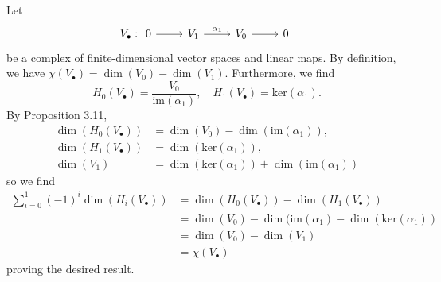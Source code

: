 \documentclass[../../master.tex]{subfiles}
\begin{document}
\begin{solution}
    Let
	\[
        V_{\bullet}:
	\begin{tikzcd}
            0 & V_1 & V_0 & 0
	    \arrow[from=1-1, to=1-2]
	    \arrow[from=1-2, to=1-3, "\alpha_1"]
	    \arrow[from=1-3, to=1-4]
	\end{tikzcd}
	\]
        be a complex of finite-dimensional vector spaces and linear maps.
        By definition, we have $\chi(V_{\bullet}) = \dim(V_0) - \dim(V_1)$.
        Furthermore, we find
        \[
            H_0 (V_{\bullet}) = \frac{V_0}{\text{im} (\alpha_1)}, \quad H_1(V_{\bullet}) = \text{ker} (\alpha_1).
        \]
        By Proposition 3.11,
        \begin{align*}
            \dim(H_0(V_{\bullet})) &= \dim(V_0) - \dim(\text{im} (\alpha_1)), \\
            \dim(H_1(V_{\bullet})) &= \dim(\text{ker} (\alpha_1)), \\
            \dim(V_1) &= \dim(\text{ker} (\alpha_1)) + \dim(\text{im} (\alpha_1))
        \end{align*}
        so we find
        \begin{align*}
            \sum_{i=0}^{1} (-1)^{i} \dim(H_i(V_{\bullet})) &= \dim(H_0(V_{\bullet})) - \dim(H_1(V_{\bullet})) \\
                                                           &= \dim(V_0) - \dim(\text{im} (\alpha_1) - \dim(\text{ker} (\alpha_1)) \\
                                                           &= \dim(V_0) - \dim(V_1) \\
                                                           &= \chi(V_{\bullet})
        \end{align*}
        proving the desired result.
\end{solution}
\end{document}

